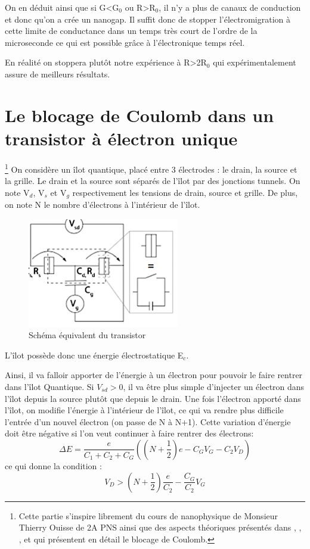 On en déduit ainsi que si G<G${_0}$ ou R>R${_0}$, il n'y a plus de canaux de conduction et donc qu'on a crée un nanogap. Il suffit donc de stopper l'électromigration à cette limite de conductance dans un temps très court de l'ordre de la microseconde ce qui est possible grâce à l'électronique temps réel\cite{11}.

En réalité on stoppera plutôt notre expérience à R>2R${_0}$ qui expérimentalement assure de meilleurs résultats.

\section{Le blocage de Coulomb dans un transistor à électron unique}
\footnote{Cette partie s'inspire librement du cours de nanophysique de Monsieur Thierry Ouisse de 2A PNS ainsi que des aspects théoriques présentés dans \cite{3}, \cite{5}, \cite{10}, \cite{13} et \cite{15} qui présentent en détail le blocage de Coulomb.}
On considère un îlot quantique, placé entre 3 électrodes : le drain, la source et la grille. Le drain et la source sont séparés de l'îlot par des jonctions tunnels. On note V${_d}$, V${_s}$ et V${_g}$ respectivement les tensions de drain, source et grille. De plus, on note N le nombre d'électrons à l'intérieur de l'îlot. 
\begin{figure}[h]
    \begin{center}
        \includegraphics[width=250px]{Images/2_Blocage_Coulomb_Schema}
        \caption{Schéma équivalent du transistor}
    \end{center}
\end{figure}

L'îlot possède donc une énergie électrostatique E${_c}$.

Ainsi, il va falloir apporter de l'énergie à un électron pour pouvoir le faire rentrer dans l'îlot Quantique. Si $V_{sd}>0$, il va être plus simple  d'injecter un électron dans l'îlot depuis la source plutôt que depuis le drain. Une fois l'électron apporté dans l'îlot, on modifie l'énergie à l'intérieur de l'îlot, ce qui va rendre plus difficile l'entrée d'un nouvel électron (on passe de N à N+1). Cette variation d'énergie doit être négative si l'on veut continuer à faire rentrer des électrons:
\[\Delta E = \frac{e}{C_1 + C_2 + C_G}\left((N + \frac{1}{2})e - C_G V_G - C_2 V_D\right)\]
ce qui donne la condition :
\[V_D > (N + \frac{1}{2})\frac{e}{C_2} - \frac{C_G}{C_2}V_G\]

